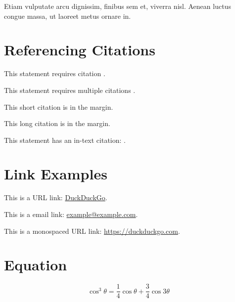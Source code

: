 Etiam vulputate arcu dignissim, finibus sem et, viverra nisl. Aenean luctus congue massa, ut laoreet metus ornare in.


\section{Referencing Citations}

This statement requires citation \autocite{githubskabelon}.

This statement requires multiple citations \autocite{simacbog2021, crixit2024}.

This short citation is in the margin.

This long citation is in the margin.

This statement has an in-text citation: \textcite{tablesgenerator}.


\section{Link Examples}

This is a URL link: \href{https://www.duckduckgo.com}{DuckDuckGo}.

This is a email link: \href{mailto:example@example.com}{example@example.com}.

This is a monospaced URL link: \url{https://duckduckgo.com}.


\section{Equation}

\begin{equation}
  \cos^3 \theta =\frac{1}{4}\cos\theta+\frac{3}{4}\cos 3\theta
  \label{eq:example}
\end{equation}

